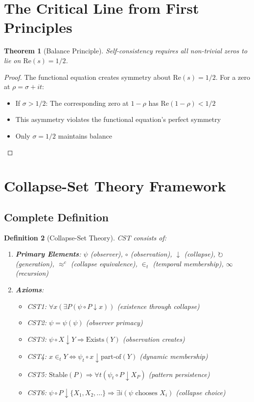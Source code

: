 \documentclass[12pt]{article}
\newtheorem{theorem}{Theorem}[section]
\newtheorem{definition}[theorem]{Definition}
\begin{document}
\section{The Critical Line from First Principles}

\begin{theorem}[Balance Principle]
Self-consistency requires all non-trivial zeros to lie on $\text{Re}(s) = 1/2$.
\end{theorem}

\begin{proof}
The functional equation creates symmetry about $\text{Re}(s) = 1/2$. For a zero at $\rho = \sigma + it$:
\begin{itemize}
\item If $\sigma > 1/2$: The corresponding zero at $1-\rho$ has $\text{Re}(1-\rho) < 1/2$
\item This asymmetry violates the functional equation's perfect symmetry
\item Only $\sigma = 1/2$ maintains balance
\end{itemize}
\end{proof}

\section{Collapse-Set Theory Framework}

\subsection{Complete Definition}

\begin{definition}[Collapse-Set Theory]
CST consists of:
\begin{enumerate}
\item \textbf{Primary Elements}: $\psi$ (observer), $\circ$ (observation), $\downarrow$ (collapse), $\circlearrowright$ (generation), $\approx^c$ (collapse equivalence), $\in_t$ (temporal membership), $\infty$ (recursion)

\item \textbf{Axioms}:
\begin{itemize}
\item CST1: $\forall x (\exists P (\psi \circ P \downarrow x))$ (existence through collapse)
\item CST2: $\psi = \psi(\psi)$ (observer primacy)
\item CST3: $\psi \circ X \downarrow Y \Rightarrow \text{Exists}(Y)$ (observation creates)
\item CST4: $x \in_t Y \Leftrightarrow \psi_t \circ x \downarrow \text{part-of}(Y)$ (dynamic membership)
\item CST5: $\text{Stable}(P) \Rightarrow \forall t (\psi_t \circ P \downarrow X_P)$ (pattern persistence)
\item CST6: $\psi \circ P \downarrow \{X_1, X_2, ...\} \Rightarrow \exists i (\psi \text{ chooses } X_i)$ (collapse choice)
\end{itemize}
\end{enumerate}
\end{definition}
\end{document}
